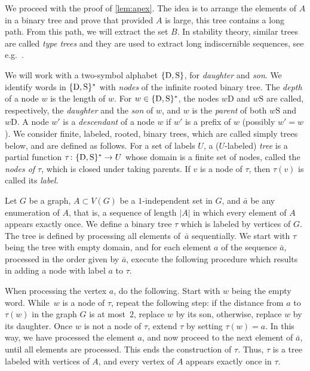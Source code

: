 We proceed with the proof of \cref{lem:apex}.
The idea is to arrange the elements of $A$ in a binary tree
and prove that provided $A$ is large, this tree contains a long path. From this path, we will 
extract the set $B$. 
In stability theory, similar trees are called \emph{type trees} and they are used to extract long indiscernible sequences, see e.g.~\cite{malliaris2014regularity}. 


\newcommand{\dau}{\mathrm{D}}
\newcommand{\son}{\mathrm{S}}
	
	We will work with a two-symbol alphabet $\set{\dau,\son}$, for {\em{daughter}} and {\em{son}}.
	We identify words in $\set{\dau,\son}^*$ with \emph{nodes}
	of the infinite rooted binary tree. 
  The \emph{depth} of a node $w$ is the length of $w$.
  For $w\in \set{\dau,\son}^*$,
	 the nodes $w\dau$ and $w\son$ are called, respectively, the \emph{daughter} and the \emph{son} of $w$,
	and $w$ is the \emph{parent} of both $w\son$ and $w\dau$. A node $w'$ is a {\em{descendant}} of a node $w$ if $w'$ is a prefix of $w$ (possibly $w'=w$).
	We consider
	 finite, labeled, rooted, binary trees, which are called simply trees below, and are defined as follows.
	 For a set of labels $U$, a ($U$-labeled) \emph{tree} is a partial function $\tau\from \set{\dau,\son}^*\to U$ whose domain is a finite set of nodes, 
	 called the \emph{nodes of $\tau$}, which is closed under taking parents. 
	 If $v$ is a node of $\tau$, then $\tau(v)$ is called its \emph{label}.
  
  Let $G$ be a graph, $A\subset V(G)$ be a $1$-independent set in $G$,
  and $\bar a$ be any enumeration of $A$, that is, a sequence of length $|A|$ in which every element of $A$ appears exactly once.
  We define a binary tree $\tau$ which is 
  labeled by vertices of $G$. The tree is defined by processing all elements of~$\bar a$ sequentially. 
  We start with $\tau$ being the  tree with empty domain, and for each element $a$ of the sequence $\bar a$, processed in the order given by $\bar a$, 
  execute the following procedure which results in adding a node with label $a$ to $\tau$.
  
When processing the vertex $a$, do the following. Start with $w$ being the empty word. While~$w$ is a node of $\tau$, repeat the following step: 
  if the distance from $a$ to $\tau(w)$ in the graph 
  $G$ is at most~$2$, replace $w$ by its son, otherwise, replace $w$ by its daughter.
  Once $w$ is not a node of $\tau$, extend $\tau$ by setting  $\tau(w)=a$. In this way, we have processed the element $a$, and now
    proceed to the next element of $\bar a$, until all elements are processed. This ends the construction of $\tau$.
    Thus, $\tau$ is a tree labeled with vertices of $A$, and every vertex of $A$ appears exactly once in $\tau$.
	

